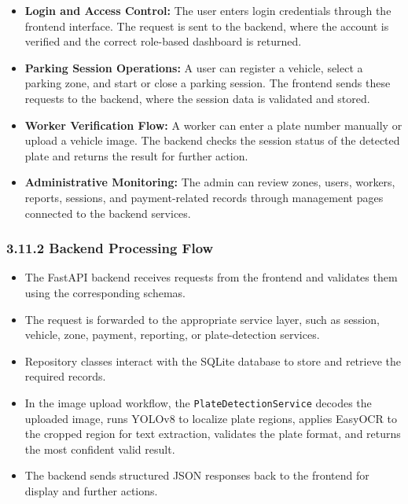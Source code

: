 \documentclass[12pt,a4paper,oneside]{report}
\begin{document}
\begin{itemize}[leftmargin=2em]
    \item \textbf{Login and Access Control:}
    The user enters login credentials through the frontend interface. The request is sent to the backend, where the account is verified and the correct role-based dashboard is returned.

    \item \textbf{Parking Session Operations:}
    A user can register a vehicle, select a parking zone, and start or close a parking session. The frontend sends these requests to the backend, where the session data is validated and stored.

    \item \textbf{Worker Verification Flow:}
    A worker can enter a plate number manually or upload a vehicle image. The backend checks the session status of the detected plate and returns the result for further action.

    \item \textbf{Administrative Monitoring:}
    The admin can review zones, users, workers, reports, sessions, and payment-related records through management pages connected to the backend services.
\end{itemize}

\subsubsection*{3.11.2 Backend Processing Flow}

\begin{itemize}[leftmargin=2em]
    \item The FastAPI backend receives requests from the frontend and validates them using the corresponding schemas.

    \item The request is forwarded to the appropriate service layer, such as session, vehicle, zone, payment, reporting, or plate-detection services.

    \item Repository classes interact with the SQLite database to store and retrieve the required records.

    \item In the image upload workflow, the \texttt{PlateDetectionService} decodes the uploaded image, runs YOLOv8 to localize plate regions, applies EasyOCR to the cropped region for text extraction, validates the plate format, and returns the most confident valid result.

    \item The backend sends structured JSON responses back to the frontend for display and further actions.
\end{itemize}
\end{document}
